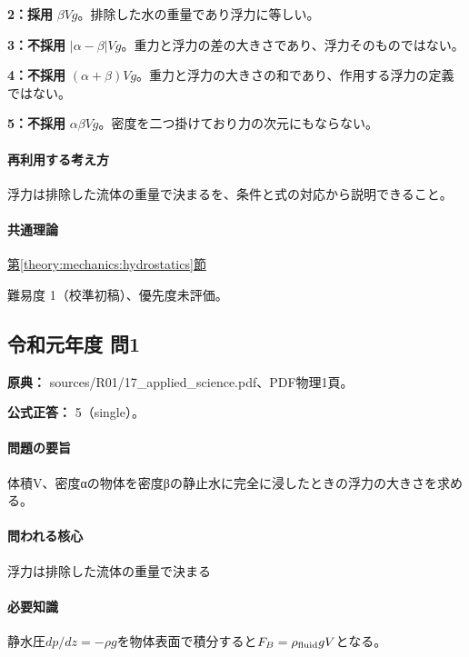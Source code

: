 \noindent\textbf{2：採用} \(\beta Vg\)。排除した水の重量であり浮力に等しい。\par

\noindent\textbf{3：不採用} \(|\alpha-\beta|Vg\)。重力と浮力の差の大きさであり、浮力そのものではない。\par

\noindent\textbf{4：不採用} \((\alpha+\beta)Vg\)。重力と浮力の大きさの和であり、作用する浮力の定義ではない。\par

\noindent\textbf{5：不採用} \(\alpha\beta Vg\)。密度を二つ掛けており力の次元にもならない。\par

\paragraph{再利用する考え方} 浮力は排除した流体の重量で決まるを、条件と式の対応から説明できること。

\paragraph{共通理論} \hyperref[theory:mechanics:hydrostatics]{第\ref*{theory:mechanics:hydrostatics}節}

\par 難易度 1（校準初稿）、優先度未評価。

\subsection{令和元年度 問1}
\label{q:r01-reg-applied-01}

\noindent\textbf{原典：} sources/R01/17\_applied\_science.pdf、PDF物理1頁。

\textbf{公式正答：} 5（single）。

\paragraph{問題の要旨} 体積V、密度αの物体を密度βの静止水に完全に浸したときの浮力の大きさを求める。

\paragraph{問われる核心} 浮力は排除した流体の重量で決まる

\paragraph{必要知識} 静水圧\(dp/dz=-\rho g\)を物体表面で積分すると\(F_B=\rho_{\rm fluid}gV\)となる。

